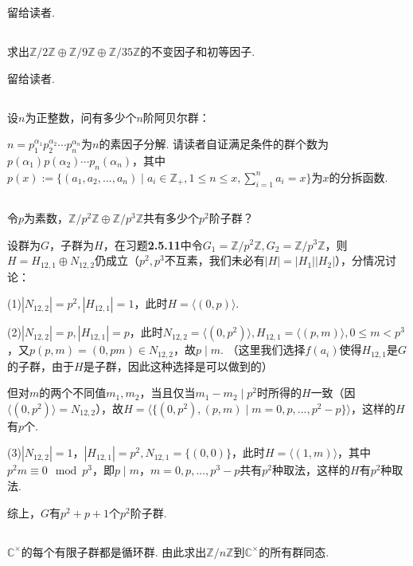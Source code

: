 \jie 留给读者.

\subsection{}
求出$\mathbb{Z}/2\mathbb{Z}\oplus \mathbb{Z}/9\mathbb{Z}\oplus \mathbb{Z}/35\mathbb{Z}$的不变因子和初等因子.

\jie 留给读者.

\subsection{}
设$n$为正整数，问有多少个$n$阶阿贝尔群：

\jie $n=p_1^{\alpha_1}p_2^{\alpha_2}\cdots p_n^{\alpha_n}$为$n$的素因子分解.
请读者自证满足条件的群个数为$p(\alpha_1)p(\alpha_2)\cdots p_n(\alpha_n)$，其中
$p(x):=\{(a_1,a_2,...,a_n)\mid a_i\in\mathbb{Z}_+, 1\leq n\leq x, \sum_{i=1}^na_i=x\}$为$x$的分拆函数.

\subsection{}
令$p$为素数，$\mathbb{Z}/p^2\mathbb{Z}\oplus \mathbb{Z}/p^3\mathbb{Z}$共有多少个$p^2$阶子群？

\jie 设群为$G$，子群为$H$，在{\heiti 习题}\textbf{2.5.11}中令$G_1=\mathbb{Z}/p^2\mathbb{Z}, G_2=\mathbb{Z}/p^3\mathbb{Z}$，则$H=H_{12,1}\oplus N_{12,2}$仍成立（$p^2,p^3$不互素，我们未必有$|H|=|H_1||H_2|$），分情况讨论：

(1)$|N_{12,2}|=p^2, |H_{12,1}|=1$，此时$H=\langle (0,p) \rangle$.

(2)$|N_{12,2}|=p, |H_{12,1}|=p$，此时$N_{12,2}=\langle (0,p^2) \rangle,
H_{12,1}=\langle (p,m)\rangle, 0\leq m<p^3$，又$p(p,m)=(0,pm)\in N_{12,2}$，故$p\mid m$. 
（这里我们选择$f(a_i)$使得$H_{12,1}$是$G$的子群，由于$H$是子群，因此这种选择是可以做到的）

但对$m$的两个不同值$m_1,m_2$，当且仅当$m_1-m_2\mid p^2$时所得的$H$一致（因$\langle (0,p^2) \rangle=N_{12,2}$），故$H=\langle \{(0,p^2),(p,m)\mid m=0,p,...,p^2-p\}\rangle$，这样的$H$有$p$个.

(3)$|N_{12,2}|=1$，$|H_{12,1}|=p^2, N_{12,1}=\{(0,0)\}$，此时$H=\langle (1,m)\rangle$，其中$p^2m\equiv 0\mod p^3$，即$p\mid m$，$m=0,p,...,p^3-p$共有$p^2$种取法，这样的$H$有$p^2$种取法.

综上，$G$有$p^2+p+1$个$p^2$阶子群.

\subsection{}
$\mathbb{C}^{\times}$的每个有限子群都是循环群. 由此求出$\mathbb{Z}/n\mathbb{Z}$到$\mathbb{C}^{\times}$的所有群同态.

